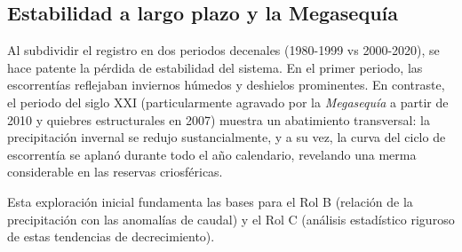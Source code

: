 \documentclass[11pt,letterpaper]{article}
\begin{document}
\subsection{Estabilidad a largo plazo y la Megasequía}
Al subdividir el registro en dos periodos decenales (1980-1999 vs 2000-2020), se hace patente la pérdida de estabilidad del sistema. En el primer periodo, las escorrentías reflejaban inviernos húmedos y deshielos prominentes. En contraste, el periodo del siglo XXI (particularmente agravado por la \textit{Megasequía} a partir de 2010 y quiebres estructurales en 2007) muestra un abatimiento transversal: la precipitación invernal se redujo sustancialmente, y a su vez, la curva del ciclo de escorrentía se aplanó durante todo el año calendario, revelando una merma considerable en las reservas criosféricas.

Esta exploración inicial fundamenta las bases para el Rol B (relación de la precipitación con las anomalías de caudal) y el Rol C (análisis estadístico riguroso de estas tendencias de decrecimiento).
\end{document}

